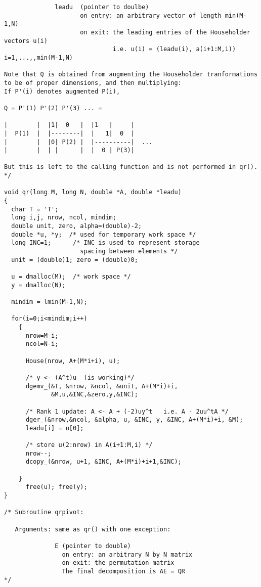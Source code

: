 \documentclass{article}
\begin{document}
\begin{verbatim}
              leadu  (pointer to doulbe)
                     on entry: an arbitrary vector of length min(M-1,N)
                     on exit: the leading entries of the Householder vectors u(i) 
                              i.e. u(i) = (leadu(i), a(i+1:M,i)) i=1,...,,min(M-1,N)

Note that Q is obtained from augmenting the Householder tranformations
to be of proper dimensions, and then multiplying:
If P'(i) denotes augmented P(i),

Q = P'(1) P'(2) P'(3) ... =
            
|        |  |1|  0   |  |1   |     |
|  P(1)  |  |--------|  |   1|  0  |
|        |  |0| P(2) |  |----------|  ...  
|        |  | |      |  |  0 | P(3)|   

But this is left to the calling function and is not performed in qr().
*/

void qr(long M, long N, double *A, double *leadu)
{
  char T = 'T';  
  long i,j, nrow, ncol, mindim;
  double unit, zero, alpha=(double)-2;
  double *u, *y;  /* used for temporary work space */
  long INC=1;      /* INC is used to represent storage 
                     spacing between elements */
  unit = (double)1; zero = (double)0;

  u = dmalloc(M);  /* work space */
  y = dmalloc(N);

  mindim = lmin(M-1,N);

  for(i=0;i<mindim;i++)
    {
      nrow=M-i;
      ncol=N-i;

      House(nrow, A+(M*i+i), u);

      /* y <- (A^t)u  (is working)*/ 
      dgemv_(&T, &nrow, &ncol, &unit, A+(M*i)+i, 
             &M,u,&INC,&zero,y,&INC); 
        
      /* Rank 1 update: A <- A + (-2)uy^t   i.e. A - 2uu^tA */
      dger_(&nrow,&ncol, &alpha, u, &INC, y, &INC, A+(M*i)+i, &M);
      leadu[i] = u[0];

      /* store u(2:nrow) in A(i+1:M,i) */
      nrow--; 
      dcopy_(&nrow, u+1, &INC, A+(M*i)+i+1,&INC);

    }
      free(u); free(y);
}

/* Subroutine qrpivot:

   Arguments: same as qr() with one exception:

              E (pointer to double) 
                on entry: an arbitrary N by N matrix
                on exit: the permutation matrix
                The final decomposition is AE = QR
*/


\end{verbatim}
\end{document}
